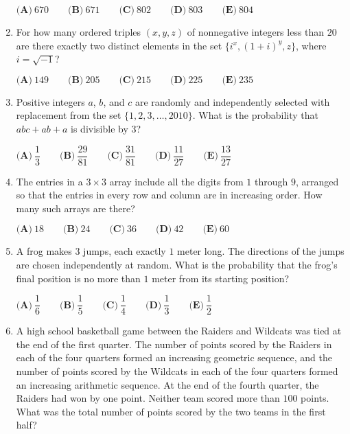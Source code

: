 \documentclass{article}
\begin{document}
\begin{enumerate}[label=\arabic*., itemsep=0.5em]
\(\textbf{(A)}\ 670 \qquad \textbf{(B)}\ 671 \qquad \textbf{(C)}\ 802 \qquad \textbf{(D)}\ 803 \qquad \textbf{(E)}\ 804\)\par \vspace{0.5em}\item For how many ordered triples \((x,y,z)\) of nonnegative integers less than \(20\) are there exactly two distinct elements in the set \(\{i^x, (1+i)^y, z\}\), where \(i=\sqrt{-1}\)?

\(\textbf{(A)}\ 149 \qquad \textbf{(B)}\ 205 \qquad \textbf{(C)}\ 215 \qquad \textbf{(D)}\ 225 \qquad \textbf{(E)}\ 235\)\par \vspace{0.5em}\item Positive integers \(a\), \(b\), and \(c\) are randomly and independently selected with replacement from the set \(\{1, 2, 3,\dots, 2010\}\). What is the probability that \(abc + ab + a\) is divisible by \(3\)?

\(\textbf{(A)}\ \dfrac{1}{3} \qquad \textbf{(B)}\ \dfrac{29}{81} \qquad \textbf{(C)}\ \dfrac{31}{81} \qquad \textbf{(D)}\ \dfrac{11}{27} \qquad \textbf{(E)}\ \dfrac{13}{27}\)\par \vspace{0.5em}\item The entries in a \(3 \times 3\) array include all the digits from \(1\) through \(9\), arranged so that the entries in every row and column are in increasing order. How many such arrays are there?

\(\textbf{(A)}\ 18 \qquad \textbf{(B)}\ 24 \qquad \textbf{(C)}\ 36 \qquad \textbf{(D)}\ 42 \qquad \textbf{(E)}\ 60\)\par \vspace{0.5em}\item A frog makes \(3\) jumps, each exactly \(1\) meter long. The directions of the jumps are chosen independently at random. What is the probability that the frog's final position is no more than \(1\) meter from its starting position?

\(\textbf{(A)}\ \dfrac{1}{6} \qquad \textbf{(B)}\ \dfrac{1}{5} \qquad \textbf{(C)}\ \dfrac{1}{4} \qquad \textbf{(D)}\ \dfrac{1}{3} \qquad \textbf{(E)}\ \dfrac{1}{2}\)\par \vspace{0.5em}\item A high school basketball game between the Raiders and Wildcats was tied at the end of the first quarter. The number of points scored by the Raiders in each of the four quarters formed an increasing geometric sequence, and the number of points scored by the Wildcats in each of the four quarters formed an increasing arithmetic sequence. At the end of the fourth quarter, the Raiders had won by one point. Neither team scored more than \(100\) points. What was the total number of points scored by the two teams in the first half?


\end{enumerate}
\end{document}
